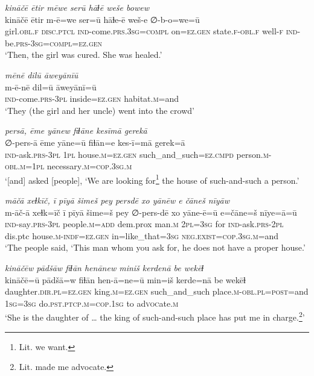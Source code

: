\ea \label{ZP.82}
\textit{kināčē ētir mēwe serū hāɫē weše bowew} \\ 
\gll kināčē ētir m-ē=we ser=ū hāɫe-ē weš-e ∅-b-o=we=ū \\ 
 girl\textsc{.obl}\textsc{.f} \textsc{disc.ptcl} \textsc{ind-}come\textsc{.prs}\textsc{.3sg}\textsc{=compl} on\textsc{\textsc{=ez.gen}} state\textsc{.f}\textsc{-obl}\textsc{.f} well\textsc{-f} \textsc{ind-}be\textsc{.prs}\textsc{-3sg}\textsc{=compl}\textsc{\textsc{=ez.gen}} \\ 
\glt `Then, the girl was cured. She was healed.'
\z 
 
\ea \label{ZP.83}
\textit{mēnē dilū āweyānīū} \\ 
\gll m-ē-nē dil=ū āweyānī=ū \\ 
 \textsc{ind-}come\textsc{.prs}\textsc{-3pl} inside\textsc{\textsc{=ez.gen}} habitat\textsc{.m}=and \\ 
\glt `They (the girl and her uncle) went into the crowd'
\z 
 
\ea \label{ZP.84}
\textit{persā, ēme yānew fiɫāne kesīmā gerekā} \\ 
\gll ∅-pers-ā ēme yāne=ū fiɫān=e kes-ī=mā gerek=ā \\ 
 \textsc{ind-}ask\textsc{.prs}\textsc{-3pl} \textsc{1pl} house\textsc{.m}\textsc{\textsc{=ez.gen}} such\_and\_such\textsc{=ez}\textsc{.cmpd} person\textsc{.m}\textsc{-obl}\textsc{.m}\textsc{=1pl} necessary\textsc{.m}\textsc{=cop}\textsc{.3sg}\textsc{.m} \\ 
\glt `[and] asked [people], ‘We are looking for\footnote{Lit. we want.} the house of such-and-such a person.'
\z 
 
\ea \label{ZP.86}
\textit{māčā xeɫkīč, ī pīyā šimeš pey persdē xo yānēw e čāneš nīyāw} \\ 
\gll m-āč-ā xeɫk=īč ī pīyā šime=š pey ∅-pers-dē xo yāne-ē=ū e=čāne=š nīye=ā=ū \\ 
 \textsc{ind-}say\textsc{.prs}\textsc{-3pl} people\textsc{.m}\textsc{=add} dem.prox man\textsc{.m} \textsc{2pl}\textsc{=3sg} for \textsc{ind-}ask\textsc{.prs}-\textsc{2pl} dis.ptc house\textsc{.m}\textsc{-indf}\textsc{\textsc{=ez.gen}} in=like\_that\textsc{=3sg} \textsc{\textsc{neg.}exist}\textsc{=cop}\textsc{.3sg}\textsc{.m}=and \\ 
\glt `The people said, ‘This man whom you ask for, he does not have a proper house.'
\z 
 
\ea \label{ZP.89}
\textit{kināčēw pādšāw fiɫān henānew miniš kerdenā be wekēɫ} \\ 
\gll kināčē=ū pādšā=w fiɫān hen-ā=ne=ū min=iš kerde=nā be wekēɫ \\ 
 daughter\textsc{.dir}\textsc{.pl}\textsc{\textsc{=ez.gen}} king\textsc{.m}\textsc{\textsc{=ez.gen}} such\_and\_such place\textsc{.m}\textsc{-obl}\textsc{.pl}\textsc{=\textsc{post}}=and \textsc{1sg}\textsc{=3sg} do\textsc{.pst}\textsc{.ptcp}\textsc{.m}\textsc{=cop}\textsc{.\textsc{1sg}} to ad\textsc{voc}ate\textsc{.m} \\ 
\glt `She is the daughter of … the king of such-and-such place has put me in charge.\footnote{Lit. made me advocate.}'
\z 
 

